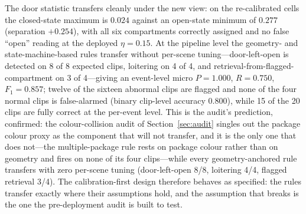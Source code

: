 \documentclass[journal,article,submit,oneauthor]{Definitions/mdpi}
\begin{document}
The door statistic transfers cleanly under the new view: on the re-calibrated cells the
closed-state maximum is $0.024$ against an open-state minimum of $0.277$ (separation
$+0.254$), with all six compartments correctly assigned and no false ``open'' reading at
the deployed $\eta=0.15$. At the pipeline level the geometry- and state-machine-based
rules transfer without per-scene tuning---door-left-open is detected on 8 of 8 expected
clips, loitering on 4 of 4, and retrieval-from-flagged-compartment on 3 of 4---giving an
event-level micro $P=1.000$, $R=0.750$, $F_1=0.857$; twelve of the sixteen abnormal
clips are flagged and none of the four normal clips is false-alarmed (binary clip-level accuracy
$0.800$), while 15 of the 20 clips are fully correct at the per-event level. This is the
audit's prediction, confirmed: the colour-collision audit of Section~\ref{sec:audit}
singles out the package colour proxy as the component that will not transfer, and it is the
only one that does not---the multiple-package rule rests on package colour rather than on
geometry and fires on none of its four clips---while every geometry-anchored rule transfers
with zero per-scene tuning (door-left-open 8/8, loitering 4/4, flagged retrieval 3/4). The
calibration-first design therefore behaves as specified: the rules transfer exactly where
their assumptions hold, and the assumption that breaks is the one the pre-deployment audit
is built to test.
\end{document}

